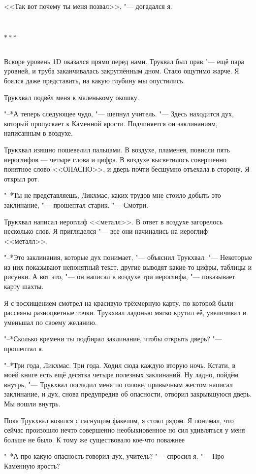 \documentclass[a4paper,10pt,fleqn]{book}
\newcommand{\ldotst}{\so{...}\xspace}
\newcommand{\razd}{~\\{\centering\Large\bfseries$\ast \ast \ast$\par}~\\}
\begin{document}
<<Так вот почему ты меня позвал>>, "--- догадался я.

\razd

Вскоре уровень 1D оказался прямо перед нами.
Труквал был прав "--- ещё пара уровней, и труба заканчивалась закруглённым дном.
Стало ощутимо жарче.
Я боялся даже представить, на какую глубину мы опустились.

Трукхвал подвёл меня к маленькому окошку.

"--*А теперь следующее чудо, "--- шепнул учитель.
"--- Здесь находится дух, который пропускает к Каменной ярости.
Подчиняется он заклинаниям, написанным в воздухе.

Трукхвал изящно пошевелил пальцами.
В воздухе, пламенея, повисли пять иероглифов --- четыре слова и цифра.
В воздухе высветилось совершенно понятное слово <<ОПАСНО>>, и дверь почти бесшумно отъехала в сторону.
Я открыл рот.

"--*Ты не представляешь, Ликхмас, каких трудов мне стоило добыть это заклинание, "--- прошептал старик.
"--- Смотри.

Трукхвал написал иероглиф <<металл>>.
В ответ в воздухе загорелось несколько слов.
Я пригляделся "--- все они начинались на иероглиф <<металл>>.

"--*Это заклинания, которые дух понимает, "--- объяснил Трукхвал.
"--- Некоторые из них показывают непонятный текст, другие выводят какие-то цифры, таблицы и рисунки.
А вот это, "--- он написал в воздухе три иероглифа, "--- показывает карту шахты.

Я с восхищением смотрел на красивую трёхмерную карту, по которой были рассеяны разноцветные точки.
Трукхвал ладонью мягко крутил её, увеличивал и уменьшал по своему желанию.

"--*Сколько времени ты подбирал заклинание, чтобы открыть дверь? "--- прошептал я.

"--*Три года, Ликхмас.
Три года.
Ходил сюда каждую вторую ночь.
Кстати, в моей книге есть ещё десятка четыре полезных заклинаний.
Ну ладно, пойдём внутрь, "--- Трукхвал погладил меня по голове, привычным жестом написал заклинание, и дух, снова предупредив об опасности, отворил закрывшуюся дверь.
Мы вошли внутрь.

Пока Трукхвал возился с гаснущим факелом, я стоял рядом.
Я понимал, что сейчас произошло нечто совершенно необыкновенное но сил удивляться у меня больше не было.
К тому же существовало кое-что поважнее\ldotst

"--*А про какую опасность говорил дух, учитель? "--- спросил я.
"--- Про Каменную ярость?
\end{document}
